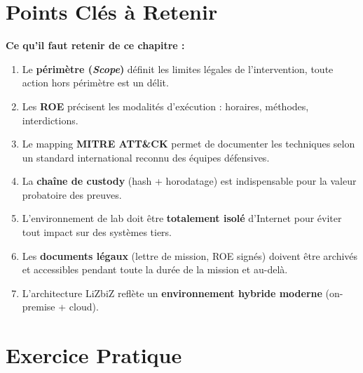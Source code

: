 \section*{Points Clés à Retenir}

\begin{boxinfo}
\textbf{Ce qu'il faut retenir de ce chapitre :}
\begin{enumerate}
    \item Le \textbf{périmètre (\textit{Scope})} définit les limites légales de
          l'intervention, toute action hors périmètre est un délit.
    \item Les \textbf{ROE} précisent les modalités d'exécution : horaires,
          méthodes, interdictions.
    \item Le mapping \textbf{MITRE ATT\&CK} permet de documenter les techniques
          selon un standard international reconnu des équipes défensives.
    \item La \textbf{chaîne de custody} (hash  + horodatage) est
          indispensable pour la valeur probatoire des preuves.
    \item L'environnement de lab doit être \textbf{totalement isolé} d'Internet
          pour éviter tout impact sur des systèmes tiers.
    \item Les \textbf{documents légaux} (lettre de mission, ROE signés) doivent
          être archivés et accessibles pendant toute la durée de la mission et
          au-delà.
    \item L'architecture LiZbiZ reflète un \textbf{environnement hybride moderne}
          (on-premise + cloud).
\end{enumerate}
\end{boxinfo}

\section*{Exercice Pratique}

